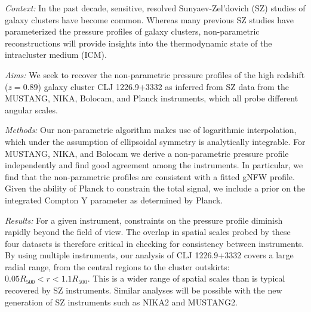 \documentclass[twocolumn,traditabstract]{aa}
\begin{document}
\abstract
    {\emph{Context:} In the past decade, sensitive, resolved Sunyaev-Zel'dovich (SZ) studies of galaxy
      clusters have become common. Whereas many previous SZ studies have parameterized the pressure
      profiles of galaxy clusters, non-parametric reconstructions will provide insights
      into the thermodynamic state of the intracluster medium (ICM).
      
      \emph{Aims:} We seek to recover the non-parametric pressure profiles of the high redshift ($z=0.89$)
      galaxy cluster CLJ 1226.9+3332 as inferred from SZ data
      from the MUSTANG, NIKA, Bolocam, and Planck instruments, which all probe different angular scales.
     
      \emph{Methods:} Our non-parametric algorithm makes use of logarithmic interpolation,
      which under the assumption of ellipsoidal symmetry is analytically integrable.
      For MUSTANG, NIKA, and Bolocam we derive a non-parametric pressure profile 
      independently and find good agreement among the instruments. In particular, we find
      that the non-parametric profiles are consistent with a fitted gNFW profile.
      Given the ability of Planck to constrain the total signal,
      we include a prior on the integrated Compton Y parameter as determined by Planck.
      
      \emph{Results:}
      For a given instrument, constraints on the pressure profile diminish rapidly beyond the
      field of view. The overlap in spatial scales probed by these four datasets is
      therefore critical in checking for consistency between instruments.
      By using multiple instruments, our analysis of CLJ 1226.9+3332 
      covers a large radial range, from the central regions to the cluster outskirts:
      $0.05 R_{500} < r < 1.1 R_{500}$. This is a wider range of spatial scales
      than is typical recovered by SZ instruments.
      Similar analyses will be possible with the new generation
      of SZ instruments such as NIKA2 and MUSTANG2.}

\end{document}
